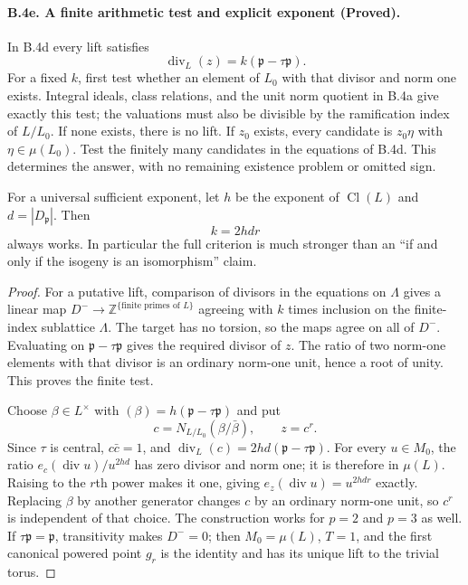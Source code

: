 \paragraph{B.4e. A finite arithmetic test and explicit exponent (Proved).}
\label{B4e}
In B.4d every lift satisfies
\[
 \operatorname{div}_L(z)=k(\mathfrak p-\tau\mathfrak p).
\]
For a fixed $k$, first test whether an element of $L_0$ with that
divisor and norm one exists. Integral ideals, class relations, and
the unit norm quotient in B.4a give exactly this test; the valuations
must also be divisible by the ramification index of $L/L_0$.
If none exists, there is no lift. If $z_0$ exists, every candidate is
$z_0\eta$ with $\eta\in\mu(L_0)$. Test the finitely many candidates
in the equations of B.4d. This determines the answer, with no
remaining existence problem or omitted sign.

For a universal sufficient exponent, let $h$ be the exponent of
$\operatorname{Cl}(L)$ and $d=|D_{\mathfrak p}|$. Then
\[
 \boxed{\ k=2hdr\ }
\]
always works. In particular the full criterion is much stronger
than an ``if and only if the isogeny is an isomorphism'' claim.

\begin{proof}
For a putative lift, comparison of divisors in the equations on
$\Lambda$ gives a linear map $D^-\to\mathbb Z^{\{
\text{finite primes of }L\}}$ agreeing with $k$ times inclusion on
the finite-index sublattice $\Lambda$. The target has no torsion, so
the maps agree on all of $D^-$. Evaluating on
$\mathfrak p-\tau\mathfrak p$ gives the required divisor of $z$.
The ratio of two norm-one elements with that divisor is an ordinary
norm-one unit, hence a root of unity. This proves the finite test.

Choose $\beta\in L^\times$ with
$(\beta)=h(\mathfrak p-\tau\mathfrak p)$ and put
\[
 c=N_{L/L_0}(\beta/\bar\beta),\qquad z=c^r.
\]
Since $\tau$ is central, $c\bar c=1$, and
$\operatorname{div}_L(c)=2hd(\mathfrak p-\tau\mathfrak p)$.
For every $u\in M_0$, the ratio
$e_c(\operatorname{div}u)/u^{2hd}$ has zero divisor and norm one;
it is therefore in $\mu(L)$. Raising to the $r$th power makes it
one, giving $e_z(\operatorname{div}u)=u^{2hdr}$ exactly.
Replacing $\beta$ by another generator changes $c$ by an ordinary
norm-one unit, so $c^r$ is independent of that choice.
The construction works for $p=2$ and $p=3$ as well. If
$\tau\mathfrak p=\mathfrak p$, transitivity makes $D^-=0$;
then $M_0=\mu(L)$, $T=1$, and the first canonical powered point
$g_r$ is the identity and has its unique lift to the trivial torus.
\end{proof}

